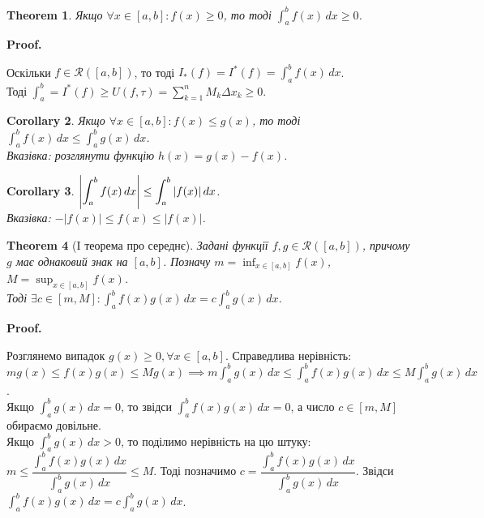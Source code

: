 \documentclass[a4paper, 10pt]{article}
\makeatletter
\def\huge{\displaystyle}
\def\qed{$\blacksquare$}
\theoremstyle{theoremdd}
\newtheorem{theorem}{Theorem}[subsection]
\theoremstyle{theoremdd}
\theoremstyle{theoremdd}
\theoremstyle{theoremdd}
\theoremstyle{theoremdd}
\theoremstyle{theoremdd}
\theoremstyle{theoremdd}
\theoremstyle{theoremdd}
\newtheorem{corollary}[theorem]{Corollary}
\renewenvironment{proof}[1][Proof.\\]{\par
\pushQED{\hfill \qed}%
\normalfont \topsep6\p@\@plus6\p@\relax
\trivlist
\item\relax
{\bfseries
#1\@addpunct{.}}\hspace\labelsep\ignorespaces
}{%
\popQED\endtrivlist\@endpefalse
}
\makeatother
\begin{document}
\begin{theorem}
Якщо $\forall x \in [a,b]: f(x) \geq 0$, то тоді $\huge\int_a^b f(x)\,dx \geq 0$.
\end{theorem}

\begin{proof}
Оскільки $f \in \mathcal{R}([a,b])$, то тоді $I_*(f) = I^*(f) = \huge\int_a^b f(x) \,dx$.\\
Тоді $\huge\int_a^b = I^*(f) \geq U(f, \tau) = \huge\sum_{k=1}^n M_k \Delta x_k \geq 0$.
\end{proof}

\begin{corollary}
Якщо $\forall x \in [a,b]: f(x) \leq g(x)$, то тоді $\huge\int_a^b f(x)\,dx \leq \int_a^b g(x)\,dx$.\\
\textit{Вказівка: розглянути функцію $h(x) = g(x) - f(x)$.}
\end{corollary}

\begin{corollary}
$\huge \abs{\int_a^b f(x)\,dx} \leq \int_a^b |f(x)|\,dx$.\\
\textit{Вказівка: $-|f(x)| \leq f(x) \leq |f(x)|$.}
\end{corollary}

\begin{theorem}[I теорема про середнє]
Задані функції $f,g \in \mathcal{R}([a,b])$, причому $g$ має однаковий знак на $[a,b]$. Позначу $m = \huge \inf_{x \in [a,b]}f(x)$, $M = \huge \sup_{x \in [a,b]}f(x)$. \\ 
Тоді $\exists c \in \huge [m,M]: \int_a^b f(x)g(x)\,dx = c \int_a^b g(x)\,dx$.
\end{theorem}

\begin{proof}
Розглянемо випадок $g(x) \geq 0, \forall x \in [a,b]$. Справедлива нерівність:\\
$mg(x) \leq f(x)g(x) \leq M g(x) \implies \huge m\int_a^b g(x)\,dx \leq \int_a^b f(x)g(x)\,dx \leq M \int_a^b g(x)\,dx$.\\
Якщо $\huge\int_a^b g(x)\,dx = 0$, то звідси $\huge\int_a^b f(x)g(x)\,dx = 0$, а число $c \in [m,M]$ обираємо довільне.
\bigskip \\
Якщо $\huge\int_a^b g(x)\,dx > 0$, то поділимо нерівність на цю штуку:\\
$m \leq \dfrac{\huge\int_a^b f(x)g(x)\,dx}{\huge\int_a^b g(x)\,dx} \leq M$. Тоді позначимо $c = \dfrac{\huge\int_a^b f(x)g(x)\,dx}{\huge\int_a^b g(x)\,dx}$. Звідси $\huge\int_a^b f(x)g(x)\,dx = c \int_a^b g(x)\,dx$.
\end{proof}
\end{document}
